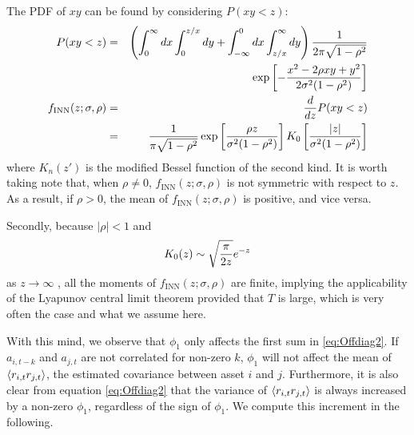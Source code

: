\documentclass{book}
\begin{document}
The PDF of $xy$ can be found by considering $P(xy < z)$:
\begin{eqnarray*}
  P(xy < z) &=& \left(\int_0^\infty dx \int_0^{z/x} dy
    +\int_{-\infty}^0 dx \int_{z/x}^\infty dy \right)
    {1 \over 2\pi \sqrt{1 - \rho^2}} \\
    &&
    \exp\left[
      -{x^2 -2\rho xy + y^2
        \over
        2\sigma^2 (1 - \rho^2)} 
    \right] \\
  f_\text{{INN}}(z; \sigma, \rho) &=& {d \over dz} P(xy < z)\\
  &=& {1 \over \pi \sqrt{1 - \rho^2}} \exp\left[
    {\rho z \over \sigma^2 (1 - \rho^2)}\right] K_0\left[
    {|z| \over \sigma^2 (1 - \rho^2)}
  \right]
\end{eqnarray*}
where $K_n(z')$ is the modified Bessel function of the second
kind. It is worth taking note that, when $\rho \neq 0$,
$f_\text{{INN}}(z; \sigma, \rho)$ is not symmetric with respect to
$z$. As a result, if $\rho > 0$, the mean of $f_\text{{INN}}(z;
\sigma, \rho)$ is positive, and vice versa.

Secondly, because $|\rho| < 1$ and
\begin{equation*}
  K_0(z) \sim \sqrt{\pi \over 2z} e^{-z}
\end{equation*}
as $z \to \infty$ \cite{Olver:2010:NHMF}, all the moments of
$f_\text{{INN}}(z; \sigma, \rho)$ are finite, implying the
applicability of the Lyapunov central limit theorem provided that $T$
is large, which is very often the case and what we assume here.

With this mind, we observe that $\phi_1$ only affects the first sum in
\ref{eq:Offdiag2}. If $a_{i,t-k}$ and $a_{j,t}$ are not correlated for
non-zero $k$, $\phi_1$ will not affect the mean of $\langle r_{i,t}
  r_{j, t}\rangle$, the estimated covariance between asset $i$ and
$j$. Furthermore, it is also clear from equation \ref{eq:Offdiag2}
that the variance of $\langle r_{i,t}r_{j, t}\rangle$ is always increased by a
non-zero $\phi_1$, regardless of the sign of $\phi_1$. We compute this
increment in the following.
\end{document}
